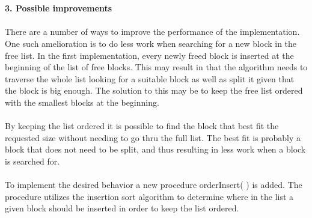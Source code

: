 \documentclass[a4paper,10pt]{article}
\begin{document}
\maketitle
\textbf
{\\\\3. Possible improvements\\\\}
There are a number of ways to improve the performance of the implementation. One such amelioration is to do less work when searching for a new block in the free list. In the first implementation, every newly freed block is inserted at the beginning of the list of free blocks. This may result in that the algorithm needs to traverse the whole list looking for a suitable block as well as split it given that the block is big enough. The solution to this may be to keep the free list ordered with the smallest blocks at the beginning. \\\\By keeping the list ordered it is possible to find the block that best fit the requested size without needing to go thru the full list. The best fit is probably a block that does not need to be split, and thus resulting in less work when a block is searched for. \\\\To implement the desired behavior a new procedure orderInsert( ) is added. The procedure utilizes the insertion sort algorithm to determine where in the list a given block should be inserted in order to keep the list ordered.
\end{document}
